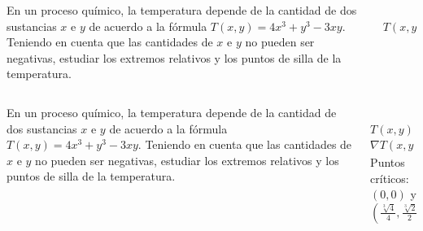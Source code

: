 \documentclass[aspectratio=149,10pt,t]{beamer}
\begin{document}
\begin{frame}
\begin{columns}
\begin{column}[T]{0.65\textwidth}
En un proceso químico, la temperatura depende de la cantidad de dos sustancias $x$ e $y$ de acuerdo a la fórmula $T(x,y)=4x^3+y^3-3xy$.
Teniendo en cuenta que las cantidades de $x$ e $y$ no pueden ser negativas, estudiar los extremos relativos y los puntos de silla de la temperatura.
\end{column}
\begin{column}[T]{0.35\textwidth}
\\
$T(x,y)=4x^3+y^3-3xy$
\end{column}
\end{columns}
\end{frame}


\begin{frame}
\begin{columns}
\begin{column}[T]{0.6\textwidth}
En un proceso químico, la temperatura depende de la cantidad de dos sustancias $x$ e $y$ de acuerdo a la fórmula $T(x,y)=4x^3+y^3-3xy$.
Teniendo en cuenta que las cantidades de $x$ e $y$ no pueden ser negativas, estudiar los extremos relativos y los puntos de silla de la temperatura.
\end{column}
\begin{column}[T]{0.4\textwidth}
\\
$T(x,y)=4x^3+y^3-3xy$\\
$\nabla T(x,y)=(12x^2-3y, 3y^2-3x)$\\
Puntos críticos: $(0,0)$ y $(\frac{\sqrt[3]{4}}{4}, \frac{\sqrt[3]{2}}{2})$
\end{column}
\end{columns}
\end{frame}
\end{document}
